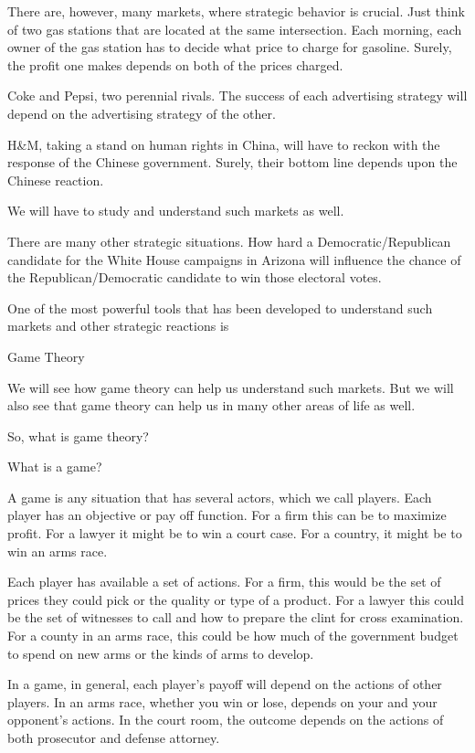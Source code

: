 \documentclass[
]{book}
\begin{document}
There are, however, many markets, where strategic behavior is crucial. Just think of two gas stations that are located at the same intersection. Each morning, each owner of the gas station has to decide what price to charge for gasoline. Surely, the profit one makes depends on both of the prices charged.

Coke and Pepsi, two perennial rivals. The success of each advertising strategy will depend on the advertising strategy of the other.

H\&M, taking a stand on human rights in China, will have to reckon with the response of the Chinese government. Surely, their bottom line depends upon the Chinese reaction.

We will have to study and understand such markets as well.

There are many other strategic situations. How hard a Democratic/Republican candidate for the White House campaigns in Arizona will influence the chance of the Republican/Democratic candidate to win those electoral votes.

One of the most powerful tools that has been developed to understand such markets and other strategic reactions is

\begin{center}
Game Theory

\end{center}

We will see how game theory can help us understand such markets. But we will also see that game theory can help us in many other areas of life as well.

So, what is game theory?

What is a game?

A game is any situation that has several actors, which we call players. Each player has an objective or pay off function. For a firm this can be to maximize profit. For a lawyer it might be to win a court case. For a country, it might be to win an arms race.

Each player has available a set of actions. For a firm, this would be the set of prices they could pick or the quality or type of a product. For a lawyer this could be the set of witnesses to call and how to prepare the clint for cross examination. For a county in an arms race, this could be how much of the government budget to spend on new arms or the kinds of arms to develop.

In a game, in general, each player's payoff will depend on the actions of other players. In an arms race, whether you win or lose, depends on your and your opponent's actions. In the court room, the outcome depends on the actions of both prosecutor and defense attorney.
\end{document}

